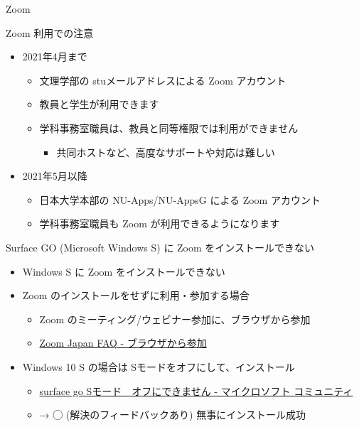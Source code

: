 \documentclass[a4j,10pt]{jsarticle}
\def\lthtmlcheckvsize{\ifdim\ht\sizebox<\vsize 
  \ifdim\wd\sizebox<\hsize\expandafter\hfill\fi \expandafter\vfill
  \else\expandafter\vss\fi}%
\begin{document}
{\newpage\clearpage
{}%
\begin{frame}[label={sec:orgddf00be},fragile]{Zoom}
\begin{block}{Zoom 利用での注意}
\begin{itemize}
\item 2021年4月まで
\begin{itemize}
\item 文理学部の stuメールアドレスによる Zoom アカウント
\item 教員と学生が利用できます
\item 学科事務室職員は、教員と同等権限では利用ができません
\begin{itemize}
\item 共同ホストなど、高度なサポートや対応は難しい
\end{itemize}
\end{itemize}
\par
\item 2021年5月以降
\begin{itemize}
\item 日本大学本部の NU-Apps/NU-AppsG による Zoom アカウント
\item 学科事務室職員も Zoom が利用できるようになります
\end{itemize}
\end{itemize}
\end{block}
\par
\begin{block}{Surface GO (Microsoft Windows S) に Zoom をインストールできない}
\begin{itemize}
\item Windows S に Zoom をインストールできない
\par
\item Zoom のインストールをせずに利用・参加する場合
\begin{itemize}
\item Zoom のミーティング/ウェビナー参加に、ブラウザから参加
\item \href{https://sites.google.com/zoom.us/zoomjapanfaq/faq/join-from-browser}{Zoom Japan FAQ - ブラウザから参加}
\end{itemize}
\par
\item Windows 10 S の場合は Sモードをオフにして、インストール
\begin{itemize}
\item \href{https://answers.microsoft.com/ja-jp/surface/forum/all/surface-go-s\%E3\%83\%A2\%E3\%83\%BC\%E3\%83\%89/e3a51b44-fcb4-463b-aaa6-a6b23c7e43b7}{surface go Sモード　オフにできません - マイクロソフト コミュニティ}
\item → ◯ (解決のフィードバックあり) 無事にインストール成功
\end{itemize}
\end{itemize}
\end{block}
\end{frame}%
\lthtmlfigureZ
\lthtmlcheckvsize\clearpage}
\end{document}
